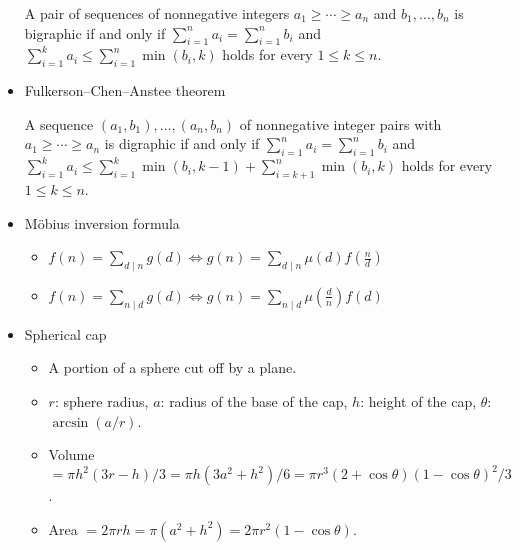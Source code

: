 \begin{itemize}
A pair of sequences of nonnegative integers $a_1\ge\cdots\ge a_n$ and $b_1,\ldots,b_n$ is bigraphic if and only if $\displaystyle\sum_{i=1}^n a_i=\displaystyle\sum_{i=1}^n b_i$ and $\displaystyle\sum_{i=1}^k a_i\le \displaystyle\sum_{i=1}^n\min(b_i,k)$ holds for every $1\le k\le n$.

\item Fulkerson–Chen–Anstee theorem

A sequence $(a_1,b_1),\ldots,(a_n,b_n)$ of nonnegative integer pairs with $a_1\ge\cdots\ge a_n$ is digraphic if and only if $\displaystyle\sum_{i=1}^n a_i=\displaystyle\sum_{i=1}^n b_i$ and $\displaystyle\sum_{i=1}^k a_i\le \displaystyle\sum_{i=1}^k\min(b_i,k-1)+\displaystyle\sum_{i=k+1}^n\min(b_i,k)$ holds for every $1\le k\le n$.

\item Möbius inversion formula

\begin{itemize}
    \itemsep-0.5em
  \item $f(n)=\sum_{d\mid n}g(d)\Leftrightarrow g(n)=\sum_{d\mid n}\mu(d)f(\frac{n}{d})$
  \item $f(n)=\sum_{n\mid d}g(d)\Leftrightarrow g(n)=\sum_{n\mid d}\mu(\frac{d}{n})f(d)$
\end{itemize}

\item Spherical cap

\begin{itemize}
    \itemsep-0.5em
  \item A portion of a sphere cut off by a plane.
  \item $r$: sphere radius, $a$: radius of the base of the cap, $h$: height of the cap, $\theta$: $\arcsin(a/r)$.
  \item Volume $=\pi h^2(3r-h)/3=\pi h(3a^2+h^2)/6=\pi r^3(2+\cos\theta)(1-\cos\theta)^2/3$.
  \item Area $=2\pi rh=\pi(a^2+h^2)=2\pi r^2(1-\cos\theta)$.
\end{itemize}

\end{itemize}
